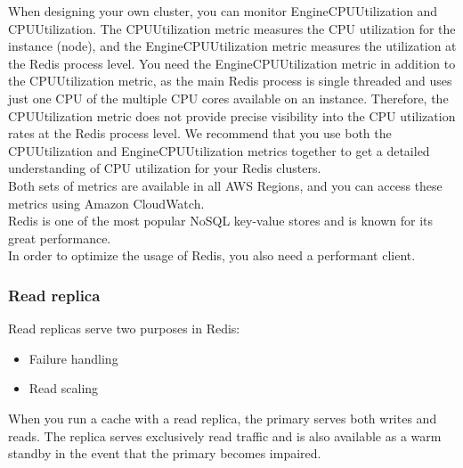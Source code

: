 \documentclass[12pt, letterpaper, twoside]{article}
\begin{document}
When designing your own cluster, you can monitor EngineCPUUtilization and CPUUtilization. The CPUUtilization 
metric measures the CPU utilization for the instance (node), and the EngineCPUUtilization metric measures the 
utilization at the Redis process level. You need the EngineCPUUtilization metric in addition to the CPUUtilization 
metric, as the main Redis process is single threaded and uses just one CPU of the multiple CPU cores available 
on an instance. Therefore, the CPUUtilization metric does not provide precise visibility into the CPU utilization 
rates at the Redis process level. We recommend that you use both the CPUUtilization and EngineCPUUtilization 
metrics together to get a detailed understanding of CPU utilization for your Redis clusters.\\

Both sets of metrics are available in all AWS Regions, and you can access these metrics using Amazon CloudWatch.\\

Redis is one of the most popular NoSQL key-value stores and is known for its great performance.\\
In order to optimize the usage of Redis, you also need a performant client.\\

\subsubsection{Read replica}
Read replicas serve two purposes in Redis:
\begin{itemize}
	\item Failure handling
	\item Read scaling
\end{itemize}
When you run a cache with a read replica, the primary serves both writes and reads. The replica serves exclusively 
read traffic and is also available as a warm standby in the event that the primary becomes impaired.\\
\end{document}
